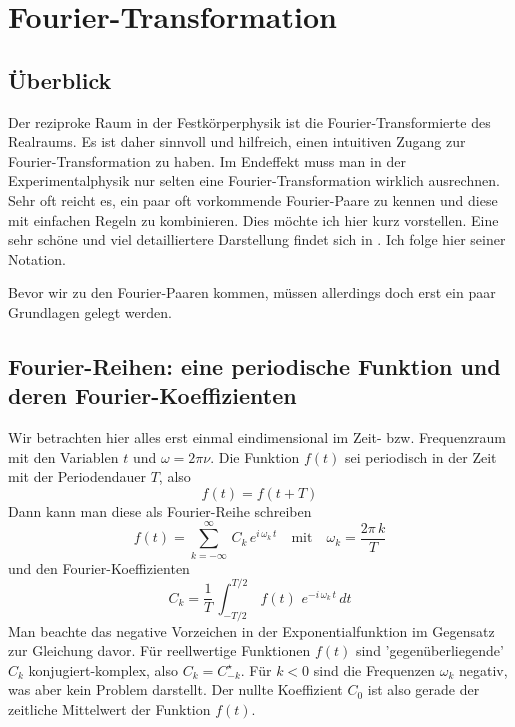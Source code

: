 \renewcommand{\lastmod}{17. Februar 2022}
\renewcommand{\chapterauthors}{Markus Lippitz}

\chapter{Fourier-Transformation}



\section{Überblick}

Der reziproke Raum in der Festkörperphysik ist die Fourier-Transformierte des Realraums. Es ist daher sinnvoll und hilfreich, einen intuitiven Zugang zur Fourier-Transformation zu haben. Im Endeffekt muss man in der Experimentalphysik nur selten eine Fourier-Transformation wirklich ausrechnen. Sehr oft reicht es, ein paar oft vorkommende Fourier-Paare zu kennen und diese mit einfachen Regeln zu kombinieren. Dies möchte ich hier kurz vorstellen. Eine sehr schöne und viel detailliertere Darstellung findet sich in \cite{Butz2011}. Ich folge hier seiner Notation.

Bevor wir zu den Fourier-Paaren kommen, müssen allerdings doch erst ein paar Grundlagen gelegt werden.

\section{Fourier-Reihen: eine periodische Funktion und deren Fourier-Koeffizienten}

Wir betrachten hier alles erst einmal eindimensional im Zeit- bzw. Frequenzraum mit den Variablen $t$ und $\omega = 2 \pi \nu$. Die Funktion $f(t)$ sei periodisch in der Zeit mit der Periodendauer $T$, also 
\begin{equation}
 f(t) = f (t + T)
\end{equation}
Dann kann man diese als Fourier-Reihe schreiben
\begin{equation}
 f(t) = \sum_{k=-\infty}^{\infty} \, C_k \, e^{i \, \omega_k \, t}
 \quad \text{mit} \quad \omega_k = \frac{2 \pi \, k}{T}
\end{equation}
und den Fourier-Koeffizienten
\begin{equation}
 C_k = \frac{1}{T} \, \int_{-T/2}^{T/2} \, f(t) \, \, e^{-i \, \omega_k \, t} \, dt
\end{equation}
Man beachte das negative Vorzeichen in der Exponentialfunktion im Gegensatz zur Gleichung davor. Für reellwertige Funktionen $f(t)$ sind 'gegenüberliegende' $C_k$ konjugiert-komplex, also  $C_k = C_{-k}^\star$. Für $k<0$ sind die Frequenzen $\omega_k$ negativ, was aber kein Problem darstellt. Der nullte Koeffizient $C_0$ ist also gerade der zeitliche Mittelwert der Funktion $f(t)$.



